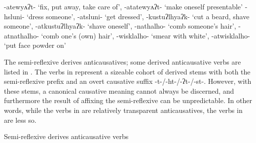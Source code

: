 \documentclass[output=paper]{langscibook}
\begin{document}
 \ex 
 \label{ex:oneida:17c}
 {-atewyʌʔt-} ‘fix, put away, take care of’, {-atatewyʌʔt-} ‘make oneself presentable’ {-hsluni-} ‘dress someone’, {-atsluni-} ‘get dressed’, {{}-kustuʔlhyaʔk-} ‘cut a beard, shave someone’, {{}-atkustuʔlhyaʔk-} ‘shave oneself’, {{}-nathalho-} ‘comb someone’s hair’, {-atnathalho-} ‘comb one’s (own) hair’, {{}-wisklalho-} ‘smear with white’, 
 {{}-atwisklalho-} ‘put face powder on’
    \z
\z
         

The semi-reflexive derives anticausatives; some derived anticausative verbs are listed in . The verbs in  represent a sizeable cohort of derived stems with both the semi-reflexive prefix and an overt causative suffix {-t-/-ht-/-ʔt-/-st-}. However, with these stems, a canonical causative meaning cannot always be discerned, and furthermore the result of affixing the semi-reflexive can be unpredictable. In other words, while the verbs in  are relatively transparent anticausatives, the verbs in  are less so. 

\ea%
    Semi-reflexive derives anticausative verbs\label{ex:oneida:18}\\
\z
\end{document}
